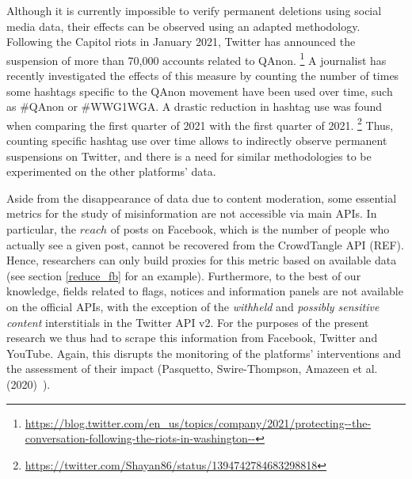 \documentclass{article}
\begin{document}
Although it is currently impossible to verify permanent deletions using social media data, their effects can be observed using an adapted methodology.
Following the Capitol riots in January 2021, Twitter has announced the suspension of more than 70,000 accounts related to QAnon.
\footnote{\url{https://blog.twitter.com/en_us/topics/company/2021/protecting--the-conversation-following-the-riots-in-washington--}} 
A journalist has recently investigated the effects of this measure by counting the number of times some hashtags specific to the QAnon movement have been used over time, such as \#QAnon or \#WWG1WGA.
A drastic reduction in hashtag use was found when comparing the first quarter of 2021 with the first quarter of 2021.
\footnote{\url{https://twitter.com/Shayan86/status/1394742784683298818}}
Thus, counting specific hashtag use over time allows to indirectly observe permanent suspensions on Twitter, and there is a need for similar methodologies to be experimented on the other platforms' data.

\smallskip 

Aside from the disappearance of data due to content moderation, some essential metrics for the study of misinformation are not accessible via main APIs. 
In particular, the $reach$ of posts on Facebook, which is the number of people who actually see a given post, cannot be recovered from the CrowdTangle API (REF). 
Hence, researchers can only build proxies for this metric based on available data (see section \ref{reduce_fb} for an example). 
Furthermore, to the best of our knowledge, fields related to flags, notices and information panels are not available on the official APIs, with the exception of the {\it withheld}  and {\it possibly sensitive content} interstitials in the Twitter API v2. 
For the purposes of the present research we thus had to scrape this information from Facebook, Twitter and YouTube. 
Again, this disrupts the monitoring of the platforms' interventions and the assessment of their impact (Pasquetto, Swire-Thompson, Amazeen et al. (2020)~\cite{pasquetto}).

\smallskip
\end{document}
